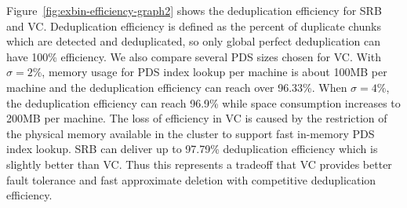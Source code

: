 Figure~\ref{fig:exbin-efficiency-graph2} shows the deduplication efficiency for SRB and VC.
Deduplication efficiency is defined as the percent of duplicate chunks
which are detected and deduplicated, so only global perfect deduplication can have 100\% efficiency.
 We also compare several PDS sizes chosen for VC.
With $\sigma=2\%$, memory usage for PDS index lookup per machine is about 100MB per machine
and  the deduplication efficiency can reach over 96.33\%.
When $\sigma=4\%$, the deduplication efficiency can reach 96.9\% while space consumption increases to 200MB per machine. 
The loss of efficiency in VC is caused by the restriction of the physical memory available
in the cluster to support fast in-memory PDS index lookup. 
SRB can deliver up to 97.79\% deduplication efficiency which is slightly better than VC.
Thus this represents a tradeoff that VC provides better fault tolerance and fast approximate deletion
with competitive deduplication efficiency.


